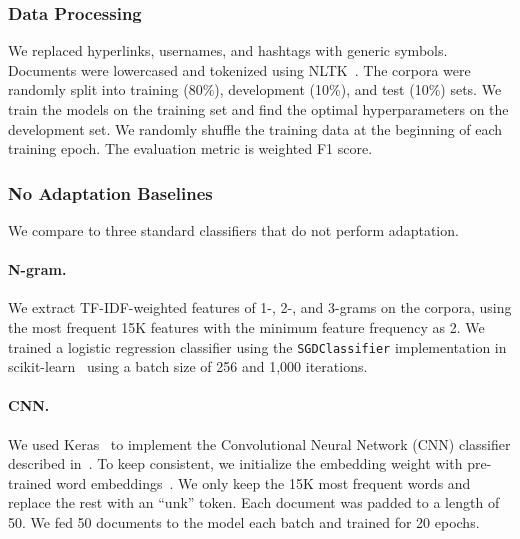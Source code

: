 \subsubsection{Data Processing}

We replaced hyperlinks, usernames, and hashtags with generic symbols. Documents were lowercased and tokenized using NLTK~\cite{bird2004nltk}. 
The corpora were randomly split into training (80\%), development (10\%), and test (10\%) sets. %
We train the models on the training set and find the optimal hyperparameters on the development set. We randomly shuffle the training data at the beginning of each training epoch. The evaluation metric is weighted F1 score.

%
%

\subsubsection{No Adaptation Baselines}
We compare to three standard classifiers that do not perform adaptation.

\paragraph{N-gram.} We extract TF-IDF-weighted features of 1-, 2-, and 3-grams on the corpora, using the most frequent 15K features with the minimum feature frequency as 2.
We trained a logistic regression classifier using the \texttt{SGDClassifier} implementation in scikit-learn~\cite{pedregosa2011scikit}
using a batch size of 256 and 1,000 iterations. 

\paragraph{CNN.} 
We used Keras~\cite{chollet2015keras} to implement the Convolutional Neural Network (CNN) classifier described in~\cite{kim2014convolutional}. To keep consistent, we initialize the embedding weight with pre-trained word embeddings~\cite{mikolov2013distributed,pennington2014glove}. We only keep the 15K most frequent words and replace the rest with an ``unk'' token. Each document was padded to a length of 50. We fed 50 documents to the model each batch and trained for 20 epochs.

